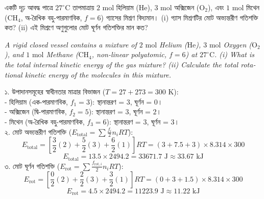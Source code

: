 \documentclass[12pt, a4paper]{article}
\begin{document}
\vspace{1.5em}

\begin{tcolorbox}[questionbox={প্রশ্ন (Question) 2}]
\noindent
একটি দৃঢ় আবদ্ধ পাত্রে $27^\circ\text{C}$ তাপমাত্রায় $2\text{ mol}$ হিলিয়াম ($\text{He}$), $3\text{ mol}$ অক্সিজেন ($\text{O}_2$), এবং $1\text{ mol}$ মিথেন ($\text{CH}_4$, অ-রৈখিক বহু-পারমাণবিক, $f=6$) গ্যাসের মিশ্রণ বিদ্যমান। (i) গ্যাস মিশ্রণটির মোট অভ্যন্তরীণ গতিশক্তি কত? (ii) এই মিশ্রণে অণুগুলোর মোট ঘূর্ণন গতিশক্তির মান কত?

\vspace{0.8em}
\begin{english}
\noindent\textit{\color{darkgray}
A rigid closed vessel contains a mixture of $2\text{ mol}$ Helium ($\text{He}$), $3\text{ mol}$ Oxygen ($\text{O}_2$), and $1\text{ mol}$ Methane ($\text{CH}_4$, non-linear polyatomic, $f=6$) at $27^\circ\text{C}$. (i) What is the total internal kinetic energy of the gas mixture? (ii) Calculate the total rotational kinetic energy of the molecules in this mixture.
}
\end{english}
\end{tcolorbox}

\vspace{1em}

\begin{tcolorbox}[solutionbox={সমাধান (Solution)}]
\noindent
১. উপাদানসমূহের স্বাধীনতার মাত্রার বিভাজন ($T = 27 + 273 = 300\text{ K}$): \\
- হিলিয়াম (এক-পারমাণবিক, $f_1 = 3$): স্থানান্তরণ = $3$, ঘূর্ণন = $0$। \\
- অক্সিজেন (দ্বি-পারমাণবিক, $f_2 = 5$): স্থানান্তরণ = $3$, ঘূর্ণন = $2$। \\
- মিথেন (অ-রৈখিক বহু-পারমাণবিক, $f_3 = 6$): স্থানান্তরণ = $3$, ঘূর্ণন = $3$। \\
২. মোট অভ্যন্তরীণ গতিশক্তি ($E_{\text{total}} = \sum \frac{f_i}{2} n_i R T$):
\[ E_{\text{total}} = \left[\frac{3}{2}(2) + \frac{5}{2}(3) + \frac{6}{2}(1)\right] R T = (3 + 7.5 + 3) \times 8.314 \times 300 \]
\[ E_{\text{total}} = 13.5 \times 2494.2 = 33671.7\text{ J} \approx 33.67\text{ kJ} \]
৩. মোট ঘূর্ণন গতিশক্তি ($E_{\text{rot}} = \sum \frac{f_{\text{rot}, i}}{2} n_i R T$):
\[ E_{\text{rot}} = \left[\frac{0}{2}(2) + \frac{2}{2}(3) + \frac{3}{2}(1)\right] R T = (0 + 3 + 1.5) \times 8.314 \times 300 \]
\[ E_{\text{rot}} = 4.5 \times 2494.2 = 11223.9\text{ J} \approx 11.22\text{ kJ} \]
\end{tcolorbox}
\end{document}
